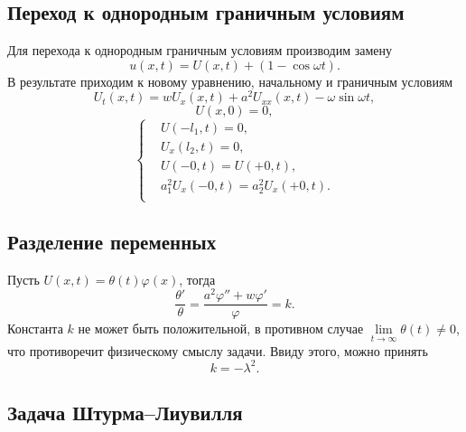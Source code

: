 \documentclass[12pt, a4paper, draft]{article}
\begin{document}
\subsection{Переход к однородным граничным условиям}
Для перехода к однородным граничным условиям производим замену
\begin{equation}
  u(x,t) = U(x,t) + (1 - \cos \omega t).
\end{equation}
В результате приходим к новому уравнению, начальному и граничным условиям
\begin{equation}
  U_t(x,t) = w U_x(x,t) + a^2 U_{xx}(x,t) - \omega\sin\omega t,
  \label{eq:14}
\end{equation}
\begin{equation}
  U(x,0) = 0,
\end{equation}
\begin{equation}
  \left\{
  \begin{aligned}
    & U(-l_1,t) = 0, \\
    & U_x(l_2,t) = 0, \\
    & U(-0, t) = U(+0, t), \\
    & a_1^2 U_{x}(-0, t) = a_2^2 U_{x}(+0, t). \\
  \end{aligned}
  \right.
  \label{eq:15}
\end{equation}
\subsection{Разделение переменных}
Пусть $ U(x,t)=\theta(t)\varphi(x) $, тогда
\begin{equation}
  \frac{\theta'}{\theta}=\frac{a^2\varphi''+w\varphi'}{\varphi}=k.
  \label{eq:1}
\end{equation}
Константа $ k $ не может быть положительной, в противном случае $\lim\limits_{t \rightarrow \infty}\theta(t) \ne 0$, что противоречит физическому смыслу задачи. Ввиду этого, можно принять
\begin{equation}
  k=-\lambda^2.
  \label{eq:2}
\end{equation}
\subsection{Задача Штурма--Лиувилля}
\end{document}
